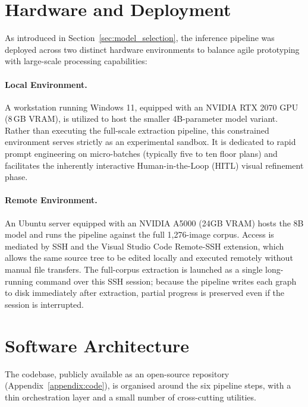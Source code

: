 \documentclass[12pt,a4paper,openright]{report}
\begin{document}
\section{Hardware and Deployment}
\label{sec:hardware_and_deploy}

As introduced in Section~\ref{sec:model_selection}, the inference pipeline was deployed across two distinct hardware environments to balance agile prototyping with large-scale processing capabilities:

\paragraph{Local Environment.} A workstation running Windows 11, equipped with an NVIDIA RTX 2070 GPU (8\,GB VRAM), is utilized to host the smaller 4B-parameter model variant. Rather than executing the full-scale extraction pipeline, this constrained environment serves strictly as an experimental sandbox. It is dedicated to rapid prompt engineering on micro-batches (typically five to ten floor plans) and facilitates the inherently interactive Human-in-the-Loop (HITL) visual refinement phase.

\paragraph{Remote Environment.} An Ubuntu server equipped with an NVIDIA A5000 (24GB VRAM) hosts the 8B model and runs the pipeline against the full 1,276-image corpus. Access is mediated by SSH and the Visual Studio Code Remote-SSH extension, which allows the same source tree to be edited locally and executed remotely without manual file transfers. The full-corpus extraction is launched as a single long-running command over this SSH session; because the pipeline writes each graph to disk immediately after extraction, partial progress is preserved even if the session is interrupted.

\section{Software Architecture}

The codebase, publicly available as an open-source repository (Appendix~\ref{appendix:code}), is organised around the six pipeline steps, with a thin orchestration layer and a small number of cross-cutting utilities.
\end{document}
